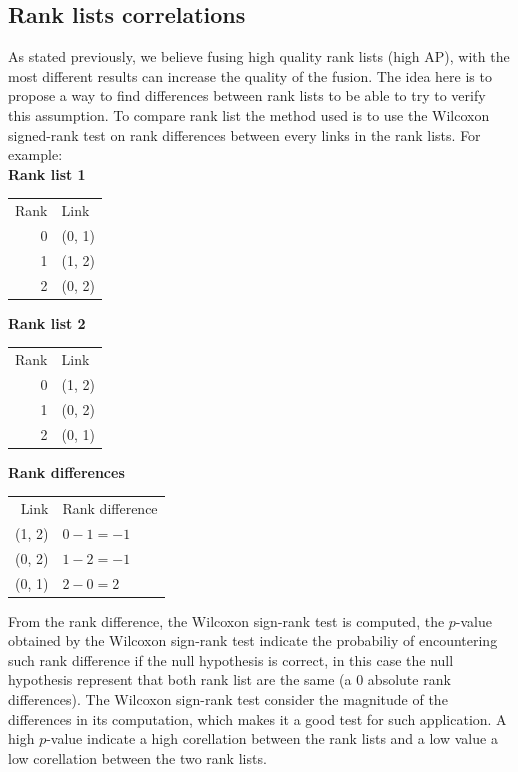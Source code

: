 \subsection{Rank lists correlations}

As stated previously, we believe fusing high quality rank lists (high AP), with the most different results can increase the quality of the fusion.
The idea here is to propose a way to find differences between rank lists to be able to try to verify this assumption.
To compare rank list the method used is to use the Wilcoxon signed-rank test on rank differences between every links in the rank lists.
For example:\\

\textbf{Rank list 1}

\begin{tabular}{r l}
Rank & Link\\
   0 & (0, 1)\\
   1 & (1, 2)\\
   2 & (0, 2)\\
\end{tabular}

\textbf{Rank list 2}

\begin{tabular}{r l}
Rank & Link\\
   0 & (1, 2)\\
   1 & (0, 2)\\
   2 & (0, 1)\\
\end{tabular}

\textbf{Rank differences}

\begin{tabular}{r l}
Link   & Rank difference\\
(1, 2) & $0 - 1 = -1$\\
(0, 2) & $1 - 2 = -1$\\
(0, 1) & $2 - 0 = 2$\\
\end{tabular}

From the rank difference, the Wilcoxon sign-rank test is computed, the $p$-value obtained by the Wilcoxon sign-rank test indicate the probabiliy of encountering such rank difference if the null hypothesis is correct, in this case the null hypothesis represent that both rank list are the same (a 0 absolute rank differences).
The Wilcoxon sign-rank test consider the magnitude of the differences in its computation, which makes it a good test for such application.
A high $p$-value indicate a high corellation between the rank lists and a low value a low corellation between the two rank lists.

